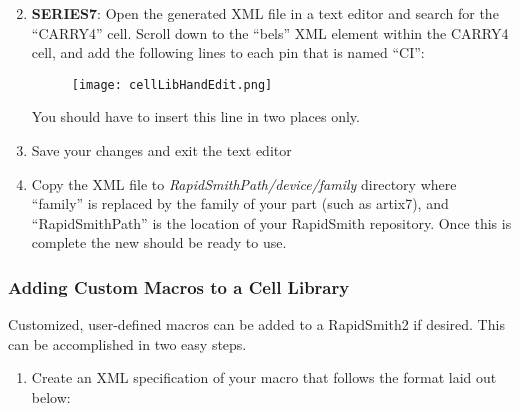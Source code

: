 \begin{enumerate}
 \setcounter{enumi}{1} 
  \item \textbf{SERIES7}: Open the generated XML file in a text editor and
  search for the ``CARRY4'' cell. Scroll down to the ``bels'' XML element within
  the CARRY4 cell, and add the following lines to each pin that is named ``CI'':
  
  \begin{figure}[H]
   \centering
   \texttt{[image: cellLibHandEdit.png]}
  \end{figure}
  
  You should have to insert this line in two places only.
  \item Save your changes and exit the text editor
  \item Copy the XML file to \textit{RapidSmithPath/device/family}
  directory where ``family'' is replaced by the family of your part (such as
  artix7), and ``RapidSmithPath'' is the location of your RapidSmith repository.
  Once this is complete the new  should be ready to use. 
\end{enumerate}

\subsubsection{Adding Custom Macros to a Cell Library} \label{sec:customMacros}
Customized, user-defined macros can be added to a RapidSmith2 
if desired. This can be accomplished in two easy steps. 

\begin {enumerate}
  \item Create an XML specification
  of your macro that follows the format laid out below: 
\end {enumerate}

